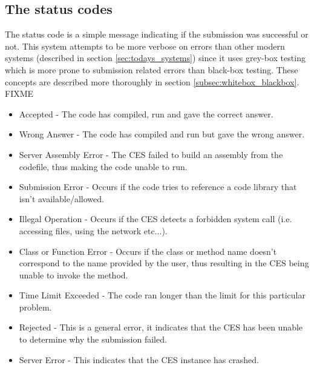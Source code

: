 \subsection{The status codes} \label{subsec:status_codes}
The status code is a simple message indicating if the submission was successful or not. This system attempts to be more verbose on errors than other modern systems (described in section \ref{sec:todays_systems}) since it uses grey-box testing which is more prone to submission related errors than black-box testing. These concepts are described more thoroughly in section \ref{subsec:whitebox_blackbox}. FIXME
\begin{itemize}
	\item Accepted - The code has compiled, run and gave the correct answer.
	\item Wrong Answer - The code has compiled and run but gave the wrong answer.
	\item Server Assembly Error - The CES failed to build an assembly from the codefile, thus making the code unable to run.
	\item Submission Error - Occurs if the code tries to reference a code library that isn't available/allowed. 
	\item Illegal Operation - Occurs if the CES detects a forbidden system call (i.e. accessing files, using the network etc...).
	\item Class or Function Error - Occurs if the class or method name doesn't correspond to the name provided by the user, thus resulting in the CES being unable to invoke the method.
	\item Time Limit Exceeded - The code ran longer than the limit for this particular problem.
	\item Rejected - This is a general error, it indicates that the CES has been unable to determine why the submission failed. 
	\item Server Error - This indicates that the CES instance has crashed.
\end{itemize}

